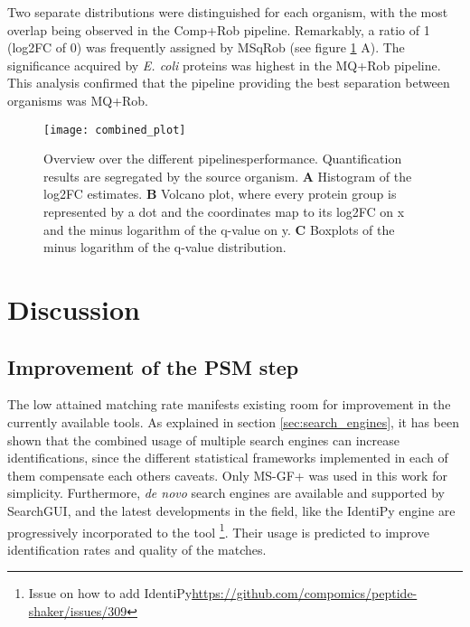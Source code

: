 Two separate distributions were distinguished for each organism, with the most overlap being  observed in the Comp+Rob pipeline. Remarkably, a ratio of 1 (\ac{log2FC} of 0) was frequently assigned by MSqRob (see figure \ref{fig:combined_plot} A). The significance acquired by \textit{E. coli} proteins was highest in the MQ+Rob pipeline. This analysis confirmed that the pipeline providing the best separation between organisms was MQ+Rob.


\begin{figure}[H]
\centering
\texttt{[image: combined\_plot]}
\caption[Pipelines performance]{Overview over the different pipelines\textquotesingle performance. Quantification results are segregated by the source organism. \textbf{A} Histogram of the \ac{log2FC} estimates. \textbf{B} Volcano plot, where every protein group is represented by a dot and the coordinates map to its \ac{log2FC} on x and the minus logarithm of the q-value on y. \textbf{C} Boxplots of the minus logarithm of the q-value distribution.}
\label{fig:combined_plot}
\end{figure}



\section{Discussion}

\subsection{Improvement of the PSM step}

The low attained matching rate manifests existing room for improvement in the currently available tools. As explained in section \ref{sec:search_engines}, it has been shown that the combined usage of multiple search engines can increase identifications, since the different statistical frameworks implemented in each of them compensate each other\textquotesingle s caveats. Only MS-GF+ was used in this work for simplicity. Furthermore, \textit{de novo} search engines are available and supported by SearchGUI, and the latest developments in the field, like the IdentiPy engine \cite{Levitsky2018} are progressively incorporated to the tool \footnote{Issue on how to add IdentiPy\href{https://github.com/compomics/peptide-shaker/issues/309}{https://github.com/compomics/peptide-shaker/issues/309}}. Their usage is predicted to improve identification rates and quality of the matches.


